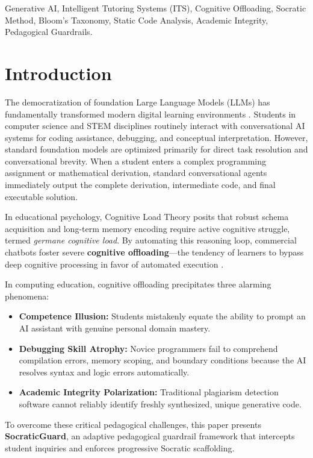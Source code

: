\documentclass[conference]{IEEEtran}
\begin{document}
\begin{IEEEkeywords}
Generative AI, Intelligent Tutoring Systems (ITS), Cognitive Offloading, Socratic Method, Bloom's Taxonomy, Static Code Analysis, Academic Integrity, Pedagogical Guardrails.
\end{IEEEkeywords}

\section{Introduction}
The democratization of foundation Large Language Models (LLMs) has fundamentally transformed modern digital learning environments \cite{bloom1984, sweller1988}. Students in computer science and STEM disciplines routinely interact with conversational AI systems for coding assistance, debugging, and conceptual interpretation. However, standard foundation models are optimized primarily for direct task resolution and conversational brevity. When a student enters a complex programming assignment or mathematical derivation, standard conversational agents immediately output the complete derivation, intermediate code, and final executable solution.

In educational psychology, Cognitive Load Theory \cite{sweller1988} posits that robust schema acquisition and long-term memory encoding require active cognitive struggle, termed \textit{germane cognitive load}. By automating this reasoning loop, commercial chatbots foster severe \textbf{cognitive offloading}---the tendency of learners to bypass deep cognitive processing in favor of automated execution \cite{chi2001}.

In computing education, cognitive offloading precipitates three alarming phenomena:
\begin{itemize}
    \item \textbf{Competence Illusion:} Students mistakenly equate the ability to prompt an AI assistant with genuine personal domain mastery.
    \item \textbf{Debugging Skill Atrophy:} Novice programmers fail to comprehend compilation errors, memory scoping, and boundary conditions because the AI resolves syntax and logic errors automatically.
    \item \textbf{Academic Integrity Polarization:} Traditional plagiarism detection software cannot reliably identify freshly synthesized, unique generative code.
\end{itemize}

To overcome these critical pedagogical challenges, this paper presents \textbf{SocraticGuard}, an adaptive pedagogical guardrail framework that intercepts student inquiries and enforces progressive Socratic scaffolding.
\end{document}

